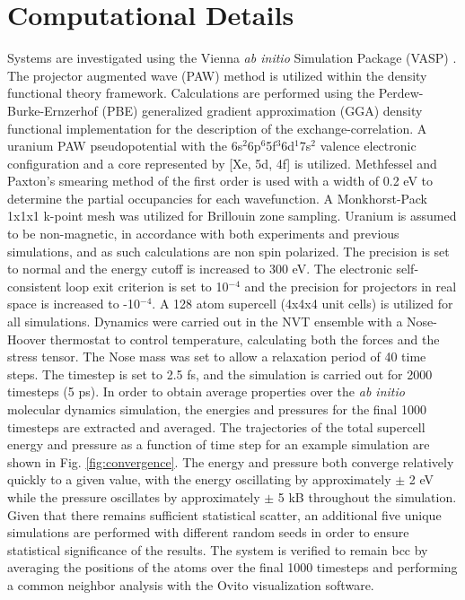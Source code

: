 \documentclass[review]{elsarticle}
\begin{document}
\section{Computational Details}
Systems are investigated using the Vienna \textit{ab initio} Simulation Package (VASP) \cite{vasp1, vasp2, vasp3, vasp4}. The projector augmented wave (PAW) method \cite{paw1, paw2} is utilized within the density functional theory \cite{dft1, dft2} framework. Calculations are performed using the Perdew-Burke-Ernzerhof (PBE) \cite{pbe1, pbe2} generalized gradient approximation (GGA) density functional implementation for the description of the exchange-correlation. A uranium PAW pseudopotential with the 6s$^{2}$6p$^{6}$5f$^{3}$6d$^{1}$7s$^{2}$ valence electronic configuration and a core represented by [Xe, 5d, 4f] is utilized. Methfessel and Paxton's smearing method \cite{methfessel} of the first order is used with a width of 0.2 eV to determine the partial occupancies for each wavefunction. A Monkhorst-Pack \cite{monkhorst} 1x1x1 k-point mesh was utilized for Brillouin zone sampling. Uranium is assumed to be non-magnetic, in accordance with both experiments and previous simulations, and as such calculations are non spin polarized. The precision is set to normal and the energy cutoff is increased to 300 eV. The electronic self-consistent loop exit criterion is set to 10$^{-4}$ and the precision for projectors in real space is increased to -10$^{-4}$. A 128 atom supercell (4x4x4 unit cells) is utilized for all simulations. Dynamics were carried out in the NVT ensemble with a Nose-Hoover thermostat to control temperature, calculating both the forces and the stress tensor. The Nose mass was set to allow a relaxation period of 40 time steps. The timestep is set to 2.5 fs, and the simulation is carried out for 2000 timesteps (5 ps). In order to obtain average properties over the \textit{ab initio} molecular dynamics simulation, the energies and pressures for the final 1000 timesteps are extracted and averaged. The trajectories of the total supercell energy and pressure as a function of time step for an example simulation are shown in Fig. \ref{fig:convergence}. The energy and pressure both converge relatively quickly to a given value, with the energy oscillating by approximately $\pm$ 2 eV while the pressure oscillates by approximately $\pm$ 5 kB throughout the simulation. Given that there remains sufficient statistical scatter, an additional five unique simulations are performed with different random seeds in order to ensure statistical significance of the results. The system is verified to remain bcc by averaging the positions of the atoms over the final 1000 timesteps and performing a common neighbor analysis with the Ovito \cite{ovito} visualization software. 
\end{document}
